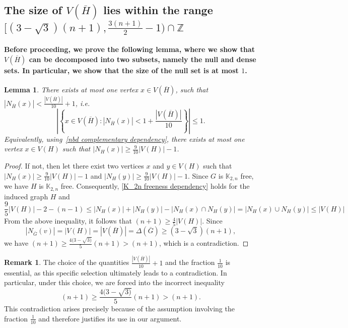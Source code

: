 \documentclass[reqno,10pt]{amsart}
\newtheorem{lemma}[theorem]{Lemma}
\theoremstyle{definition}
\newtheorem*{remark}{Remark}
\begin{document}
\subsection{The size of \texorpdfstring{$V(\overline{H})$}{$V(\overline{H})$} lies within the range \texorpdfstring{$[(3-\sqrt{3})(n+1), \frac{3(n+1)}{2}-1)\cap\mathbb{Z}$}{$[(3-\sqrt{3})(n+1), \frac{3(n+1)}{2}-1)\cap\mathbb{Z}$}} 

\paragraph{ Before proceeding, we prove the following lemma, where we show that $V(\overline{H})$ can be decomposed into two subsets, namely the null and dense sets. In particular, we show that the size of the null set is at most $1$.}
\begin{lemma}\label{almost one-tenth}
There exists at most one vertex $x\in V(\overline{H})$, such that $|N_{\overline{H}}(x)|<\frac{|V(\overline{H})|}{10}+1$, i.e. 
\begin{equation*}
 \left|\left\{x\in  V(\overline{H}): |N_{\overline{H}}(x)|<1+\frac{|V(\overline{H})|}{10}\right\}\right|\leq1.   
\end{equation*}
Equivalently, using~\eqref{nbd complementary dependency}, there exists at most one vertex $x\in V(H)$ such that $|N_{H}(x)|\geq \frac{9}{10}|V(H)|-1$.
\end{lemma}
\begin{proof}
If not, then let there exist two vertices $x$ and $y\in V(H)$ such that $|N_{H}(x)|\geq\frac{9}{10}|V(H)|-1$ and $|N_{H}(y)|\geq\frac{9}{10}|V(H)|-1$. Since $G$ is $\mathbb{K}_{2,n}$ free, we have $H$ is $\mathbb{K}_{2,n}$ free. Consequently, \eqref{K_2n freeness dependency} holds for the induced graph $H$ and 
\begin{equation*}
\frac{9}{5}|V(H)|-2-(n-1)\leq|N_{H}(x)|+|N_{H}(y)|-|N_{H}(x)\cap N_{H}(y)|=|N_{H}(x)\cup N_{H}(y)|\leq|V(H)|  
\end{equation*}
From the above inequality, it follows that $(n+1)\geq\frac{4}{5}|V(H)|$. Since 
\begin{equation*}
|N_{\overline{G}}(v)|=|V(H)|=|V(\overline{H})|=\Delta(\overline{G})\geq(3-\sqrt{3})(n+1),    
\end{equation*}
we have $(n+1)\geq\frac{4(3-\sqrt{3)}}{5}(n+1)>(n+1)$, which is a contradiction.
\end{proof}

\begin{remark}
The choice of the quantities $\frac{|V(\overline{H})|}{10}+1$ and the fraction $\frac{1}{10}$ is essential, as this specific selection ultimately leads to a contradiction. In particular, under this choice, we are forced into the incorrect inequality 
\begin{equation*}
(n+1)\geq\frac{4(3-\sqrt{3)}}{5}(n+1)>(n+1).
\end{equation*}
This contradiction arises precisely because of the assumption involving the fraction $\frac{1}{10}$ and therefore justifies its use in our argument.
\end{remark}
\end{document}
